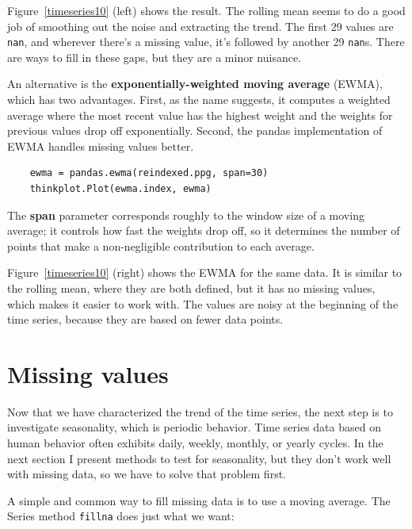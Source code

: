 \documentclass[12pt]{book}
\begin{document}
Figure~\ref{timeseries10} (left)
shows the result. 
The rolling mean seems to do a good job of smoothing out the noise and
extracting the trend.  The first 29 values are {\tt nan}, and wherever
there's a missing value, it's followed by another 29 {\tt nan}s.
There are ways to fill in these gaps, but they are a minor nuisance.

An alternative is the {\bf exponentially-weighted moving average} (EWMA),
which has two advantages.  First, as the name suggests, it computes
a weighted average where the most recent value has the highest weight
and the weights for previous values drop off exponentially.
Second, the pandas implementation of EWMA handles missing values
better.

\begin{verbatim}
    ewma = pandas.ewma(reindexed.ppg, span=30)
    thinkplot.Plot(ewma.index, ewma)
\end{verbatim}

The {\bf span} parameter corresponds roughly to the window size of
a moving average; it controls how fast the weights drop off, so it
determines the number of points that make a non-negligible contribution
to each average.

Figure~\ref{timeseries10} (right) shows the EWMA for the same data.
It is similar to the rolling mean, where they are both defined,
but it has no missing values, which makes it easier to work with.  The
values are noisy at the beginning of the time series, because they are
based on fewer data points.


\section{Missing values}

Now that we have characterized the trend of the time series, the
next step is to investigate seasonality, which is periodic behavior.
Time series data based on human behavior often exhibits daily,
weekly, monthly, or yearly cycles.  In the next section I present
methods to test for seasonality, but they don't work well with
missing data, so we have to solve that problem first.

A simple and common way to fill missing data is to use a moving
average.  The Series method {\tt fillna} does just what we want:
\end{document}
